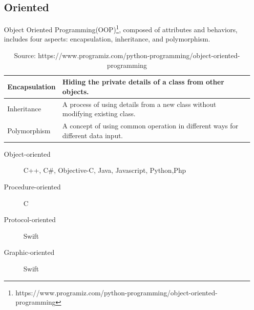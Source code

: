 \documentclass[12pt, a4paper]{report}
\begin{document}
	\subsection{Oriented}
	Object Oriented Programming(OOP)\footnote{https://www.programiz.com/python-programming/object-oriented-programming}, composed of attributes and behaviors, includes four aspects: encapsulation, inheritance, and polymorphism.
	\begin{table}[H]
	\begin{tabular}{l|l}
	\toprule
	Encapsulation & Hiding the private details of a class from other objects. \\
	\hline
	Inheritance & A process of using details from a new class without modifying existing class.\\
	\hline
	Polymorphism & A concept of using common operation in different ways for different data input. \\
	\bottomrule
	\end{tabular}
	\caption{Source: https://www.programiz.com/python-programming/object-oriented-programming}
	\end{table}
	
	\begin{description}
		\item[Object-oriented] C++, C\#, Objective-C, Java, Javascript, Python,Php
		\item[Procedure-oriented] C
		\item[Protocol-oriented] Swift
		\item[Graphic-oriented] Swift
	\end{description}
	
	
		
\end{document}
